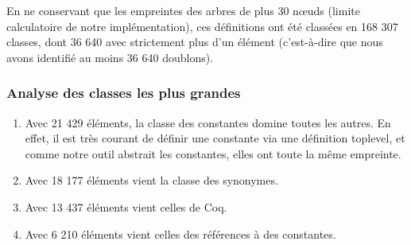 En ne conservant que les empreintes des arbres de plus 30 nœuds (limite calculatoire de notre implémentation), ces définitions ont été classées en 168 307 classes, dont 36 640 avec strictement plus d'un élément (c'est-à-dire que nous avons identifié au moins 36 640 doublons).

\subsubsection{Analyse des classes les plus grandes}
\begin{enumerate}
\item Avec 21 429 éléments, la classe des constantes domine toutes les autres. En effet, il est très courant de définir une constante via une définition toplevel, et comme notre outil abstrait les constantes, elles ont toute la même empreinte.
\item Avec 18 177 éléments vient la classe des synonymes.
\item Avec 13 437 éléments vient celles de Coq.
\item Avec 6 210 éléments vient celles des références à des constantes.
\end{enumerate}
